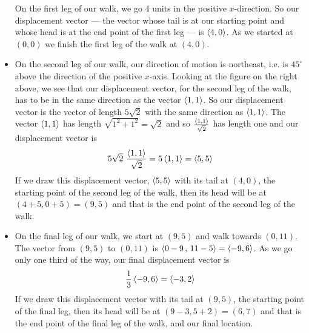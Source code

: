 \begin{eg}
\begin{itemize}
On the first leg of our walk, we go 4 units in the positive $x$-direction.
So our displacement vector --- the vector whose tail is at our starting point and whose head is at the end point of the first leg --- is $\left< 4,0\right>$. 
As we started at $(0,0)$ we finish the first leg of the walk at $(4,0)$.
\item
On the second leg of our walk, our direction of motion is northeast, i.e. is
$45^\circ$ above the direction of the positive $x$-axis. Looking at the figure 
on the right above, we see that our displacement vector, for the second leg of the walk, has to be in the same direction as the vector $\left< 1,1\right>$.
So our displacement vector is the vector of length $5\sqrt{2}$ with the same direction as $\left< 1,1\right>$. The vector $\left< 1,1\right>$ has length
$\sqrt{1^2+1^2}=\sqrt{2}$ and so $\frac{\left< 1,1\right>}{\sqrt{2}}$ has length one
and our displacement vector is
\begin{equation*}
5\sqrt{2}\ \frac{\left< 1,1\right>}{\sqrt{2}}
=5 \left< 1,1\right> 
=\left< 5,5\right>
\end{equation*}
If we draw this displacement vector, $\left< 5,5\right>$ with its tail at 
$(4,0)$, the starting point of the second leg of the walk, then its head 
will be at $(4+5, 0+5)=(9,5)$ and that is the end point of the second 
leg of the walk.
\item
On the final leg of our walk, we start at $(9,5)$ and walk towards $(0,11)$.
The vector from $(9,5)$ to $(0,11)$ is $\left< 0-9\,,\,11-5\right> =\left< -9,6\right>$.
As we go only one third of the way, our final displacement vector is
\begin{equation*}
\frac{1}{3}\left< -9,6\right>
=\left< -3,2\right>
\end{equation*}
If we draw this displacement vector with its tail at 
$(9,5)$, the starting point of the final leg, then its head 
will be at $(9-3, 5+2)=(6,7)$ and that is the end point of the final
leg of the walk, and our final location.
\end{itemize}
\end{eg}

